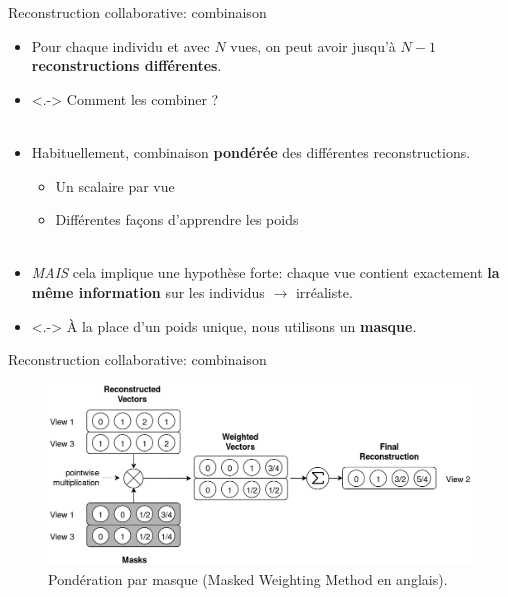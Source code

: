 \documentclass[hyperref={pdfpagelabels=false}]{beamer}
\begin{document}
    \begin{frame}{Reconstruction collaborative: combinaison}
        \begin{itemize}
            \item<+-> Pour chaque individu et avec $N$ vues, on peut avoir 
                jusqu'à $N-1$ \textbf{reconstructions différentes}.
            \item<.-> Comment les combiner ?\\~\\
            \item<+-> Habituellement, combinaison \textbf{pondérée} des 
                différentes reconstructions.
                \begin{itemize}
                    \item Un scalaire par vue
                    \item Différentes façons d'apprendre les poids\\~\\
                \end{itemize}
            \item<+-> \textit{MAIS} cela implique une hypothèse forte: chaque 
                vue contient exactement \textbf{la même information} sur les 
                individus $\rightarrow$ irréaliste.
            \item<.-> À la place d'un poids unique, nous utilisons un 
                \textbf{masque}.
        \end{itemize}
    \end{frame}

    \begin{frame}{Reconstruction collaborative: combinaison}
        \begin{figure}[h]
            \centering
            \includegraphics[scale=.2]{mwm.png}
            \caption{Pondération par masque (Masked Weighting Method
                en anglais).
            }
        \end{figure}
    \end{frame}
\end{document}
